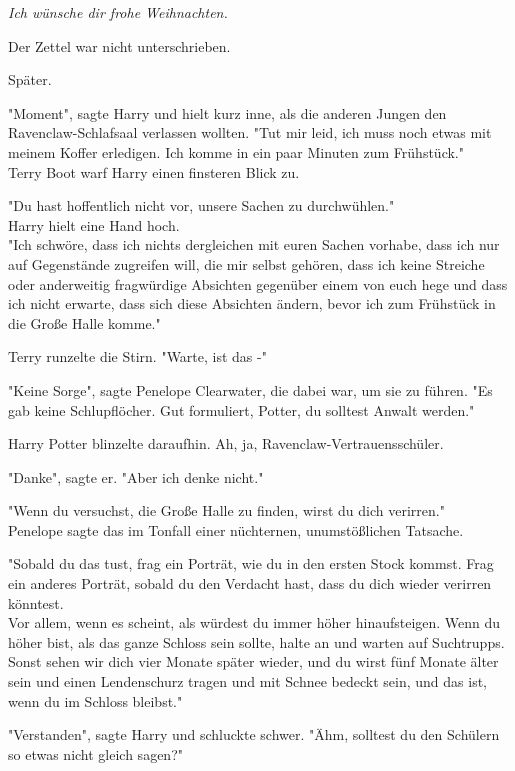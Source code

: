 {\emph{\hfill\break Ich wünsche dir frohe Weihnachten.}

Der Zettel war nicht unterschrieben.

Später.

"Moment", sagte Harry und hielt kurz inne, als die anderen Jungen den Ravenclaw-Schlafsaal verlassen wollten. "Tut mir leid, ich muss noch etwas mit meinem Koffer erledigen. Ich komme in ein paar Minuten zum Frühstück."\\ Terry Boot warf Harry einen finsteren Blick zu.

"Du hast hoffentlich nicht vor, unsere Sachen zu durchwühlen."\\ Harry hielt eine Hand hoch.\\ "Ich schwöre, dass ich nichts dergleichen mit euren Sachen vorhabe, dass ich nur auf Gegenstände zugreifen will, die mir selbst gehören, dass ich keine Streiche oder anderweitig fragwürdige Absichten gegenüber einem von euch hege und dass ich nicht erwarte, dass sich diese Absichten ändern, bevor ich zum Frühstück in die Große Halle komme."

Terry runzelte die Stirn. "Warte, ist das -"

"Keine Sorge", sagte Penelope Clearwater, die dabei war, um sie zu führen. "Es gab keine Schlupflöcher. Gut formuliert, Potter, du solltest Anwalt werden."

Harry Potter blinzelte daraufhin. Ah, ja, Ravenclaw-Vertrauensschüler.

"Danke", sagte er. "Aber ich denke nicht."

"Wenn du versuchst, die Große Halle zu finden, wirst du dich verirren."\\ Penelope sagte das im Tonfall einer nüchternen, unumstößlichen Tatsache.

"Sobald du das tust, frag ein Porträt, wie du in den ersten Stock kommst. Frag ein anderes Porträt, sobald du den Verdacht hast, dass du dich wieder verirren könntest.\\ Vor allem, wenn es scheint, als würdest du immer höher hinaufsteigen. Wenn du höher bist, als das ganze Schloss sein sollte, halte an und warten auf Suchtrupps.\\ Sonst sehen wir dich vier Monate später wieder, und du wirst fünf Monate älter sein und einen Lendenschurz tragen und mit Schnee bedeckt sein, und das ist, wenn du im Schloss bleibst."

"Verstanden", sagte Harry und schluckte schwer. "Ähm, solltest du den Schülern so etwas nicht gleich sagen?"

}

